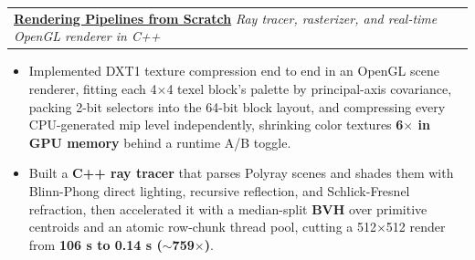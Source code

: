 \documentclass[letterpaper,11pt]{article}
\makeatletter
\newcommand{\BulletItems}[1]{
  \item
    \begin{itemize}[label={-}, leftmargin=*, labelsep=0.3em, topsep=0pt, partopsep=0pt, itemsep=0pt, parsep=0pt]
      \small #1
    \end{itemize}\vspace{-5pt}
}
\newcommand{\SLSubheadingItemLink}[4]{
  \vspace{-2pt}\item
    \begin{tabular*}{0.97\textwidth}[t]{l@{\extracolsep{\fill}}r}
      \textbf{\href{#2}{#1}} \textbar{} \textit{\small #3} & {\small #4} \\
    \end{tabular*}\vspace{-7pt}
}
\makeatother
\begin{document}
    \SLSubheadingItemLink
      {Rendering Pipelines from Scratch}{https://github.com/anupreetsingh/Rendering-pipelines}
      {Ray tracer, rasterizer, and real-time OpenGL renderer in C++}{} %
    \BulletItems{
      \item Implemented DXT1 texture compression end to end in an OpenGL scene renderer, fitting each 4$\times$4 texel block's palette by principal-axis covariance, packing 2-bit selectors into the 64-bit block layout, and compressing every CPU-generated mip level independently, shrinking color textures \textbf{6$\times$ in GPU memory} behind a runtime A/B toggle.
      \item Built a \textbf{C++ ray tracer} that parses Polyray scenes and shades them with Blinn-Phong direct lighting, recursive reflection, and Schlick-Fresnel refraction, then accelerated it with a median-split \textbf{BVH} over primitive centroids and an atomic row-chunk thread pool, cutting a 512$\times$512 render from \textbf{106 s to 0.14 s ($\sim$759$\times$)}.
    }
\end{document}

